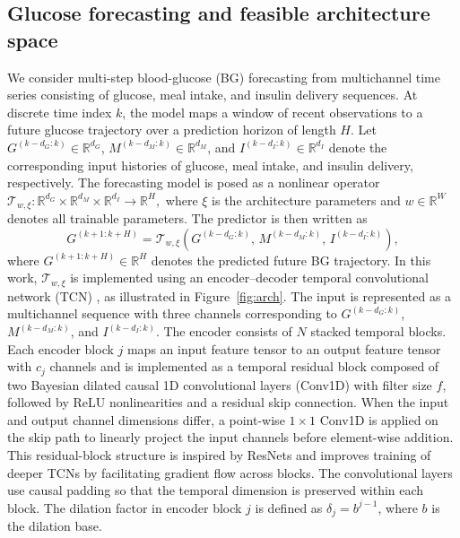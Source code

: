 \documentclass[preprint,12pt]{elsarticle}
\begin{document}
\subsection{Glucose forecasting and feasible architecture space}
We consider multi-step blood-glucose (BG) forecasting from multichannel time series consisting of glucose, meal intake, and insulin delivery sequences. At discrete time index $k$, the model maps a window of recent observations to a future glucose trajectory over a prediction horizon of length $H$. Let \(G^{(k-d_G:k)} \in \mathbb{R}^{d_G}\), \(M^{(k-d_M:k)} \in \mathbb{R}^{d_M}\), and \(I^{(k-d_I:k)} \in \mathbb{R}^{d_I}\) denote the corresponding input histories of glucose, meal intake, and insulin delivery, respectively. The forecasting model is posed as a nonlinear operator
$
\mathcal{T}_{w, \xi} : \mathbb{R}^{d_G} \times \mathbb{R}^{d_M} \times \mathbb{R}^{d_I} \rightarrow \mathbb{R}^{H},
$
where \(\xi\) is the architecture parameters and \(w \in \mathbb{R}^{W}\) denotes all trainable parameters.
The predictor is then written as
%
\begin{equation}
{G}^{(k+1:k+H)}
=
\mathcal{T}_{w,\xi}\!\left(
G^{(k-d_G:k)},\,
M^{(k-d_M:k)},\,
I^{(k-d_I:k)}
\right),
\label{eq:tcn_operator}
\end{equation}
where \({G}^{(k+1:k+H)} \in \mathbb{R}^{H}\) denotes the predicted future BG trajectory.
%
In this work, $\mathcal{T}_{w,\xi}$ is implemented using an encoder--decoder temporal convolutional network (TCN) \cite{bai2018empirical, zaidi2021multi}, as illustrated in Figure~\ref{fig:arch}. The input is represented as a multichannel sequence with three channels corresponding to $G^{(k-d_G:k)}$, $M^{(k-d_M:k)}$, and $I^{(k-d_I:k)}$. 
The encoder consists of $N$ stacked temporal blocks.
Each encoder block $j$ maps an input feature tensor to an output feature tensor with $c_j$ channels and is implemented as a temporal residual block composed of two Bayesian dilated causal 1D convolutional layers (Conv1D) with filter size $f$, followed by ReLU nonlinearities and a residual skip connection. When the input and output channel dimensions differ, a point-wise $1 \times 1$ Conv1D is applied on the skip path to linearly project the input channels before element-wise addition.
This residual-block structure is inspired by ResNets \cite{he2016deep} and improves training of deeper TCNs by facilitating gradient flow across blocks.
The convolutional layers use causal padding so that the temporal dimension is preserved within each block.
%
The dilation factor in encoder block $j$ is defined as $\delta_j = b^{j-1}$, where $b$ is the dilation base. 
\end{document}
